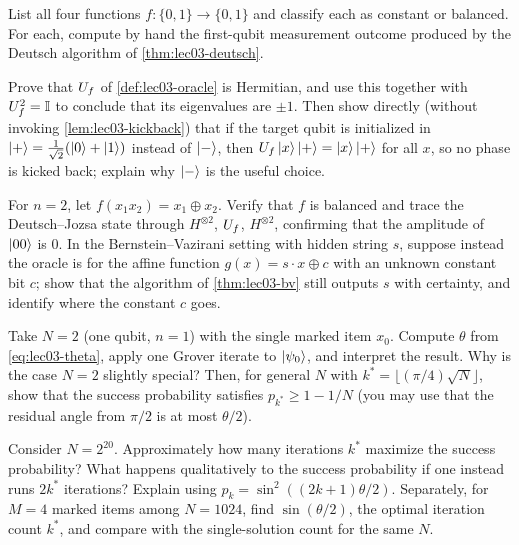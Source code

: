 \begin{exercise}\label{ex:lec03-2}
List all four functions $f:\{0,1\}\to\{0,1\}$ and classify each as constant or
balanced. For each, compute by hand the first-qubit measurement outcome produced
by the Deutsch algorithm of \cref{thm:lec03-deutsch}.
\end{exercise}

\begin{exercise}\label{ex:lec03-3}
Prove that $U_{f}$ of \cref{def:lec03-oracle} is Hermitian, and use this together
with $U_{f}^2=\mathbb{I}$ to conclude that its eigenvalues are $\pm1$. Then show directly
(without invoking \cref{lem:lec03-kickback}) that if the target qubit is
initialized in $\ket{+}=\tfrac{1}{\sqrt2}(\ket0+\ket1)$ instead of $\ket{-}$, then
$U_{f}\ket{x}\ket{+}=\ket{x}\ket{+}$ for all $x$, so no phase is kicked back; explain
why $\ket{-}$ is the useful choice.
\end{exercise}

\begin{exercise}\label{ex:lec03-4}
For $n=2$, let $f(x_1x_2)=x_1\oplus x_2$. Verify that $f$ is balanced and trace the
Deutsch--Jozsa state through $H^{\otimes 2}$, $U_{f}$, $H^{\otimes 2}$, confirming
that the amplitude of $\ket{00}$ is $0$. In the Bernstein--Vazirani setting with
hidden string $s$, suppose instead the oracle is for the affine function
$g(x)=s\cdot x\oplus c$ with an unknown constant bit $c$; show that the algorithm
of \cref{thm:lec03-bv} still outputs $s$ with certainty, and identify where the
constant $c$ goes.
\end{exercise}

\begin{exercise}\label{ex:lec03-5}
Take $N=2$ (one qubit, $n=1$) with the single marked item $x_0$. Compute $\theta$
from \eqref{eq:lec03-theta}, apply one Grover iterate to $\ket{\psi_0}$, and
interpret the result. Why is the case $N=2$ slightly special? Then, for general
$N$ with $k^{\ast}=\lfloor(\pi/4)\sqrt N\rfloor$, show that the success probability
satisfies $p_{k^{\ast}}\ge1-1/N$ (you may use that the residual angle from $\pi/2$
is at most $\theta/2$).
\end{exercise}

\begin{exercise}\label{ex:lec03-6}
Consider $N=2^{20}$. Approximately how many iterations $k^{\ast}$ maximize the
success probability? What happens qualitatively to the success probability if one
instead runs $2k^{\ast}$ iterations? Explain using $p_k=\sin^2((2k+1)\theta/2)$.
Separately, for $M=4$ marked items among $N=1024$, find $\sin(\theta/2)$, the
optimal iteration count $k^{\ast}$, and compare with the single-solution count for
the same $N$.
\end{exercise}

